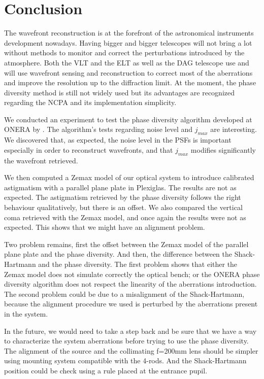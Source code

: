 
\chapter*{Conclusion}
\label{Conclusion}

The wavefront reconstruction is at the forefront of the astronomical instruments development nowadays. Having bigger and bigger telescopes will not bring a lot without methods to monitor and correct the perturbations introduced by the atmosphere. Both the VLT and the ELT as well as the DAG telescope use and will use wavefront sensing and reconstruction to correct most of the aberrations and improve the resolution up to the diffraction limit. At the moment, the phase diversity method is still not widely used but its advantages are recognized regarding the NCPA and its implementation simplicity.

\vspace{1cm}

We conducted an experiment to test the phase diversity algorithm developed at ONERA by \citet{mugnier_2006}. The algorithm's tests regarding noise level and $j_{max}$ are interesting. We discovered that, as expected, the noise level in the PSFs is important especially in order to reconstruct wavefronts, and that $j_{max}$ modifies significantly the wavefront retrieved.

We then computed a Zemax model of our optical system to introduce calibrated astigmatism with a parallel plane plate in Plexiglas. The results are not as expected. The astigmatism retrieved by the phase diversity follows the right behaviour qualitatively, but there is an offset. We also compared the vertical coma retrieved with the Zemax model, and once again the results were not as expected. This shows that we might have an alignment problem.

Two problem remains, first the offset between the Zemax model of the parallel plane plate and the phase diversity. And then, the difference between the Shack-Hartmann and the phase diversity. The first problem shows that either the Zemax model does not simulate correctly the optical bench; or the ONERA phase diversity algorithm does not respect the linearity of the aberrations introduction. The second problem could be due to a misalignment of the Shack-Hartmann, because the alignment procedure we used is perturbed by the aberrations present in the system.

In the future, we would need to take a step back and be sure that we have a way to characterize the system aberrations before trying to use the phase diversity. The alignment of the source and the collimating f=200mm lens should be simpler using mounting system compatible with the 4-rods. And the Shack-Hartmann position could be check using a rule placed at the entrance pupil.

